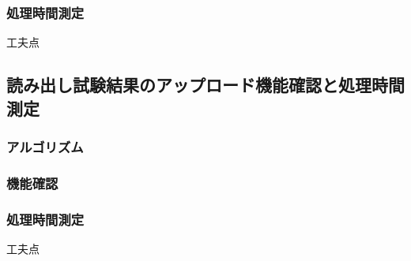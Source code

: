 \subsubsection{処理時間測定}
工夫点
\subsection{読み出し試験結果のアップロード機能確認と処理時間測定}
\subsubsection{アルゴリズム}
\subsubsection{機能確認}
\subsubsection{処理時間測定}

工夫点

